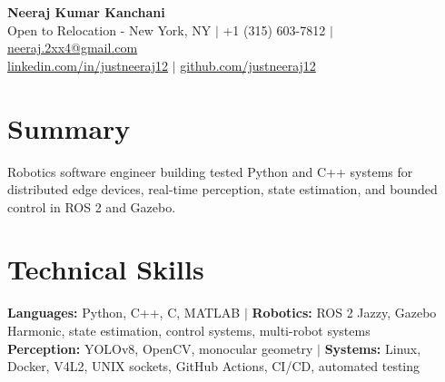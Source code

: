 \documentclass[10pt,letterpaper]{article}
\begin{document}
\begin{center}
  {\Large\textbf{Neeraj Kumar Kanchani}}\\[-1pt]
  Open to Relocation - New York, NY $\mid$ +1 (315) 603-7812 $\mid$
  \href{mailto:neeraj.2xx4@gmail.com}{neeraj.2xx4@gmail.com}\\[-1pt]
  \href{https://linkedin.com/in/justneeraj12}{linkedin.com/in/justneeraj12} $\mid$
  \href{https://github.com/justneeraj12}{github.com/justneeraj12}
\end{center}
\vspace{-7pt}

\section{Summary}
{\small Robotics software engineer building tested Python and C++ systems for distributed edge devices, real-time perception, state estimation, and bounded control in ROS 2 and Gazebo.}

\section{Technical Skills}
{\small
\textbf{Languages:} Python, C++, C, MATLAB $\mid$
\textbf{Robotics:} ROS 2 Jazzy, Gazebo Harmonic, state estimation, control systems, multi-robot systems\\[-1pt]
\textbf{Perception:} YOLOv8, OpenCV, monocular geometry $\mid$
\textbf{Systems:} Linux, Docker, V4L2, UNIX sockets, GitHub Actions, CI/CD, automated testing}
\end{document}
